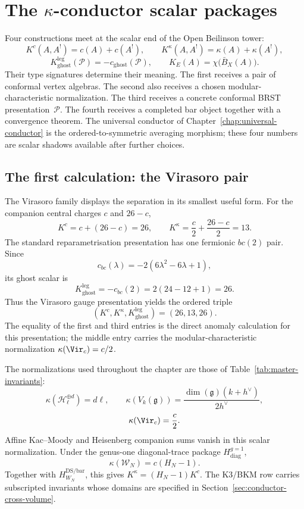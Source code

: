 \chapter{The $\kappa$-conductor scalar packages}
\label{ch:kappa-conductor}

Four constructions meet at the scalar end of the Open Beilinson tower:
\[
 K^c(A,A^!)=c(A)+c(A^!),\qquad
 K^\kappa(A,A^!)=\kappa(A)+\kappa(A^!),
\]
\[
 K_{\mathrm{ghost}}^{\mathrm{leg}}(\mathcal P)
 =-c_{\mathrm{ghost}}(\mathcal P),\qquad
 K_E(A)=\chi\bigl(\bar B_X(A)\bigr).
\]
Their type signatures determine their meaning.  The first receives a
pair of conformal vertex algebras.  The second also receives a chosen
modular-characteristic normalization.  The third receives a concrete
conformal BRST presentation~$\mathcal P$.  The fourth receives a
completed bar object together with a convergence theorem.  The
universal conductor of Chapter~\ref{chap:universal-conductor} is the
ordered-to-symmetric averaging morphism; these four numbers are scalar
shadows available after further choices.

\section{The first calculation: the Virasoro pair}

The Virasoro family displays the separation in its smallest useful
form.  For the companion central charges $c$ and $26-c$,
\[
 K^c=c+(26-c)=26,
 \qquad
 K^\kappa=\frac c2+\frac{26-c}{2}=13.
\]
The standard reparametrisation presentation has one fermionic
$bc(2)$ pair.  Since
\[
 c_{bc}(\lambda)=-2(6\lambda^2-6\lambda+1),
\]
its ghost scalar is
\[
 K_{\mathrm{ghost}}^{\mathrm{leg}}
 =-c_{bc}(2)=2(24-12+1)=26.
\]
Thus the Virasoro gauge presentation yields the ordered triple
\[
 (K^c,K^\kappa,K_{\mathrm{ghost}}^{\mathrm{leg}})=(26,13,26).
\]
The equality of the first and third entries is the direct anomaly
calculation for this presentation; the middle entry carries the
modular-characteristic normalization $\kappa(\Vir_c)=c/2$.

The normalizations used throughout the chapter are those of
Table~\ref{tab:master-invariants}:
\[
\kappa(\mathcal H_{\ell}^{\oplus d})=d\ell,
\qquad
\kappa(V_k(\mathfrak g))
=\frac{\dim(\mathfrak g)(k+h^\vee)}{2h^\vee},
\]
\[
\kappa(\Vir_c)=\frac c2.
\]
Affine Kac--Moody and Heisenberg companion sums vanish in this scalar
normalization.  Under the genus-one diagonal-trace package
$H_{\mathrm{diag}}^{g=1}$,
\[
\kappa(\mathcal W_N)=c(H_N-1).
\]
Together with $H_{W_N}^{\mathrm{DS/bar}}$, this gives
$K^\kappa=(H_N-1)K^c$.  The K3/BKM row carries subscripted invariants
whose domains are specified in
Section~\ref{sec:conductor-cross-volume}.

